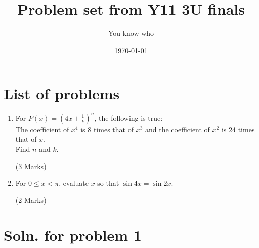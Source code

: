 \documentclass[12pt]{article}
\author{\normalsize You know who}
\title{\huge Problem set from Y11 3U finals}
\date{\today}
\begin{document}
\maketitle
\section*{List of problems}
\large

\begin{enumerate}
	\item For $P(x) = (4x + \frac{1}{k})^n$, the following is true: \\
	      The coefficient of $x^4$ is 8 times that of $x^3$ and the coefficient of $x^2$ is 24 times that of $x$. \\
	      Find $n$ and $k$. \begin{flushright} (3 Marks) \end{flushright}

	\item For $0\leq x<\pi$, evaluate $x$ so that $\sin{4x} = \sin{2x}$. \begin{flushright} (2 Marks) \end{flushright}
\end{enumerate}

\newpage
\section*{Soln. for problem 1}
\normalsize
\end{document}
